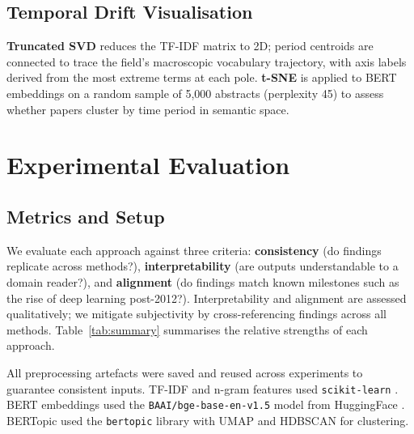\documentclass{article}
\begin{document}
\subsection{Temporal Drift Visualisation}

\textbf{Truncated SVD} \citep{scikit-learn} reduces the
TF-IDF matrix to 2D; period centroids are connected to
trace the field's macroscopic vocabulary trajectory, with
axis labels derived from the most extreme terms at each
pole. \textbf{t-SNE} \citep{vandermaaten2008} is applied
to BERT embeddings on a random sample of 5,000 abstracts
(perplexity 45) to assess whether papers cluster by time
period in semantic space.


\section{Experimental Evaluation}
\label{sec:evaluation}

\subsection{Metrics and Setup}

We evaluate each approach against three criteria:
\textbf{consistency} (do findings replicate across
methods?), \textbf{interpretability} (are outputs
understandable to a domain reader?), and
\textbf{alignment} (do findings match known milestones
such as the rise of deep learning post-2012?).
Interpretability and alignment are assessed qualitatively;
we mitigate subjectivity by cross-referencing findings
across all methods. Table~\ref{tab:summary} summarises
the relative strengths of each approach.

All preprocessing artefacts were saved and reused across
experiments to guarantee consistent inputs. TF-IDF and
n-gram features used \texttt{scikit-learn}
\citep{scikit-learn}. BERT embeddings used the
\texttt{BAAI/bge-base-en-v1.5} model from HuggingFace
\citep{bge2023}. BERTopic used the \texttt{bertopic}
library \citep{grootendorst2022bertopic} with UMAP
\citep{mcinnes2018umap} and HDBSCAN
\citep{campello2013hdbscan} for clustering.
\end{document}
